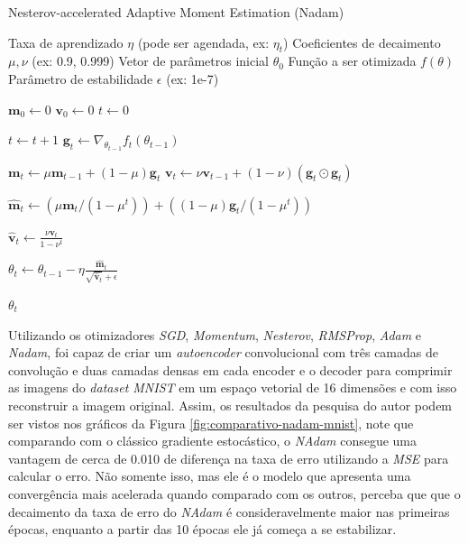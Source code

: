 \begin{algorithm}[H]
    \caption{Nesterov-accelerated Adaptive Moment Estimation (Nadam)}
    \label{alg:nadam}
    \begin{algorithmic}[1]

    \Require Taxa de aprendizado $\eta$ (pode ser agendada, ex: $\eta_t$)
    \Require Coeficientes de decaimento $\mu, \nu$ (ex: 0.9, 0.999)
    \Require Vetor de parâmetros inicial $\theta_0$
    \Require Função a ser otimizada $f(\theta)$
    \Require Parâmetro de estabilidade $\epsilon$ (ex: 1e-7)

    \State $\mathbf{m}_0 \leftarrow 0$ 
    \State $\mathbf{v}_0 \leftarrow 0$ 
    \State $t \leftarrow 0$ 

        \State $t \leftarrow t + 1$
        \State $\mathbf{g}_t \leftarrow \nabla_{\theta_{t-1}} f_t(\theta_{t-1})$
        
        \State $\mathbf{m}_t \leftarrow \mu \mathbf{m}_{t-1} + (1 - \mu) \mathbf{g}_t$
        \State $\mathbf{v}_t \leftarrow \nu \mathbf{v}_{t-1} + (1 - \nu) (\mathbf{g}_t \odot \mathbf{g}_t)$
        
        \State $\mathbf{\hat{m}}_t \leftarrow (\mu \mathbf{m}_t / (1 - \mu^t)) + ((1 - \mu) \mathbf{g}_t / (1 - \mu^t))$
        
        \State $\mathbf{\hat{v}}_t \leftarrow \frac{\nu \mathbf{v}_t}{1 - \nu^t}$
        
        \State $\theta_t \leftarrow \theta_{t-1} - \eta \frac{\mathbf{\hat{m}}_t}{\sqrt{\mathbf{\hat{v}}_t} + \epsilon}$
    \EndWhile

    \State \Return $\theta_t$ 
    \end{algorithmic}
\end{algorithm}

Utilizando os otimizadores \textit{SGD}, \textit{Momentum}, \textit{Nesterov}, \textit{RMSProp}, \textit{Adam} e \textit{Nadam}, \textcite{NadamMethod} foi capaz de criar um \textit{autoencoder} convolucional com três camadas de convolução e duas camadas densas em cada encoder e o decoder para comprimir as imagens do \textit{dataset MNIST} em um espaço vetorial de 16 dimensões e com isso reconstruir a imagem original. Assim, os resultados da pesquisa do autor podem ser vistos nos gráficos da Figura \ref{fig:comparativo-nadam-mnist}, note que comparando com o clássico gradiente estocástico, o \textit{NAdam} consegue uma vantagem de cerca de 0.010 de diferença na taxa de erro utilizando a \textit{MSE} para calcular o erro. Não somente isso, mas ele é o modelo que apresenta uma convergência mais acelerada quando comparado com os outros, perceba que que o decaimento da taxa de erro do \textit{NAdam} é consideravelmente maior nas primeiras épocas, enquanto a partir das 10 épocas ele já começa a se estabilizar.

